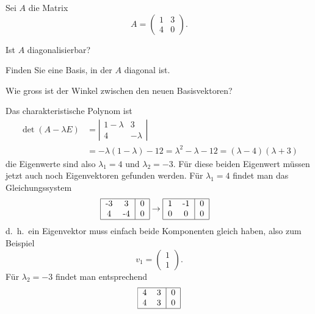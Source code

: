Sei $A$ die Matrix
\[
A=\begin{pmatrix}
1&3\\
4&0
\end{pmatrix}.
\]
\begin{teilaufgaben}
\item Ist $A$ diagonalisierbar?
\item Finden Sie eine Basis, in der $A$ diagonal ist.
\item Wie gross ist der Winkel zwischen den neuen Basisvektoren?
\end{teilaufgaben}


\begin{loesung}
Das charakteristische Polynom ist
\begin{align*}
\det(A-\lambda E)
&=\left|\begin{matrix}
1-\lambda&3\\
4&-\lambda
\end{matrix}\right|
\\
&=-\lambda(1-\lambda)-12=\lambda^2-\lambda-12=(\lambda -4)(\lambda + 3)
\end{align*}
die Eigenwerte sind also $\lambda_1 = 4$ und $\lambda_2=-3$.
Für diese beiden Eigenwert müssen jetzt auch noch Eigenvektoren
gefunden werden. Für $\lambda_1=4$ findet man das Gleichungssystem
\begin{align*}
\begin{tabular}{|cc|c|}
\hline
-3&3&0\\
4&-4&0\\
\hline
\end{tabular}
&\rightarrow
\begin{tabular}{|cc|c|}
\hline
1&-1&0\\
0&0&0\\
\hline
\end{tabular}
\end{align*}
d.~h.~ein Eigenvektor muss einfach beide Komponenten gleich haben, also
zum Beispiel
\[
v_1=\begin{pmatrix}1\\1\end{pmatrix}.
\]
Für $\lambda_2=-3$ findet man entsprechend
\begin{align*}
\begin{tabular}{|cc|c|}
\hline
4&3&0\\
4&3&0\\
\hline
\end{tabular}

\end{align*}
\end{loesung}
